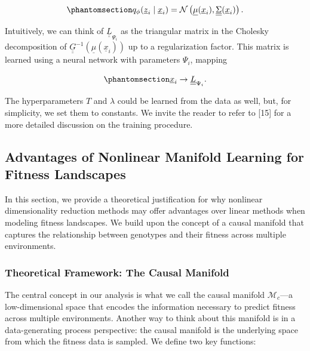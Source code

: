 \documentclass[
]{scrartcl}
\begin{document}
\begin{refsection}
\begin{equation}\phantomsection\label{eq-metric-tensor-rhvae-centroids}{
q_{\phi}(\underline{z}_i \mid \underline{x}_i) =
\mathcal{N}\left(
    \underline{\mu}{(\underline{x}_i)}, 
    \underline{\underline{\Sigma}}(\underline{x}_i)
\right).
}\end{equation}

Intuitively, we can think of \(\underline{\underline{L}}_{\Psi_i}\) as
the triangular matrix in the Cholesky decomposition of
\(\underline{\underline{G}}^{-1}(\underline{\mu}{(\underline{x}_i)})\)
up to a regularization factor. This matrix is learned using a neural
network with parameters \(\Psi_i\), mapping

\begin{equation}\phantomsection\label{eq-metric-tensor-rhvae-centroids-network}{
\underline{x}_i \rightarrow \underline{\underline{L}}_{\Psi_i}.
}\end{equation}

The hyperparameters \(T\) and \(\lambda\) could be learned from the data
as well, but, for simplicity, we set them to constants. We invite the
reader to refer to {[}15{]} for a more detailed discussion on the
training procedure.

\subsection{Advantages of Nonlinear Manifold Learning for Fitness
Landscapes}\label{sec-nonlinear}

In this section, we provide a theoretical justification for why
nonlinear dimensionality reduction methods may offer advantages over
linear methods when modeling fitness landscapes. We build upon the
concept of a causal manifold that captures the relationship between
genotypes and their fitness across multiple environments.

\subsubsection{Theoretical Framework: The Causal
Manifold}\label{theoretical-framework-the-causal-manifold}

The central concept in our analysis is what we call the causal manifold
\(\mathcal{M}_c\)---a low-dimensional space that encodes the information
necessary to predict fitness across multiple environments. Another way
to think about this manifold is in a data-generating process
perspective: the causal manifold is the underlying space from which the
fitness data is sampled. We define two key functions:


\end{refsection}
\end{document}
